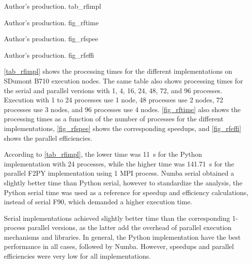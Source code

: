      {Author's production.} {tab_rfimpl}

     {Author's production.} {fig_rftime}

     {Author's production.} {fig_rfspee}

     {Author's production.} {fig_rfeffi}

\autoref {tab_rfimpl} shows the processing times for the different implementations on SDumont B710 execution nodes.  The same table also shows processing times for the serial and parallel versions with 1, 4, 16, 24, 48, 72, and 96 processes. Execution with 1 to 24 processes use 1 node, 48 processes use 2 nodes, 72 processes use 3 nodes, and 96 processes use 4 nodes. \autoref {fig_rftime} also shows the processing times as a function of the number of processes for the different implementations, \autoref {fig_rfspee} shows the corresponding speedups, and \autoref {fig_rfeffi} shows the parallel efficiencies.

According to \autoref {tab_rfimpl}, the lower time was 11~s for the Python implementation with 24 processes, while the higher time was 141.71~s for the parallel F2PY implementation using 1 MPI process. Numba serial obtained a slightly better time than Python serial, however to standardize the analysis, the Python serial time was used as a reference for speedup and efficiency calculations, instead of serial F90, which demanded a higher execution time. 

Serial implementations achieved slightly better time than the corresponding 1-process parallel versions, as the latter add the overhead of parallel execution mechanisms and libraries. In general, the Python implementation have the best performance in all cases, followed by Numba. However, speedups and parallel efficiencies were very low for all implementations. 

